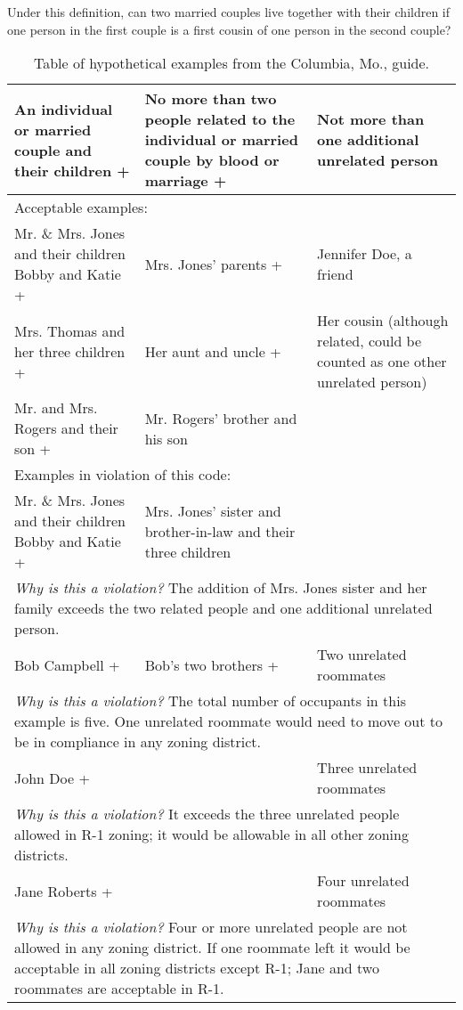 Under this definition, can two married couples live together with their children
if one person in the first couple is a first cousin of one person in the second
couple?

\begin{table}
\begin{center}
\casefont
\footnotesize
\begin{tabular}{p{}p{}p{}}
\textbf{An individual or married couple and their children +} &
\textbf{No more than two people related to the individual or married couple by
blood or marriage +} &
\textbf{Not more than one additional unrelated person} \\
\hline
\multicolumn{3}{l}{Acceptable examples:} \\
\hline
Mr. \& Mrs. Jones and their children Bobby and Katie + & Mrs. Jones' parents
+ & Jennifer Doe, a friend \\
Mrs. Thomas and her three children + & Her aunt and uncle + & Her cousin
(although related, could be counted as one other unrelated person) \\
Mr. and Mrs. Rogers and their son + & Mr. Rogers' brother and his son & \\
\hline
\multicolumn{3}{l}{Examples in violation of this code:} \\
\hline
Mr. \& Mrs. Jones and their children Bobby and Katie + & Mrs. Jones'
sister and brother-in-law and their three children & \\
\multicolumn{3}{p{0.9\textwidth}}{\emph{Why is this a violation?}
The addition of Mrs. Jones sister and her family exceeds the two related people
and one additional unrelated person.} \\
\hline
Bob Campbell + & Bob's two brothers + & Two unrelated roommates \\
\multicolumn{3}{p{0.9\textwidth}}{\emph{Why is this a violation?}
The total number of occupants in this example is five. One unrelated roommate
would need to move out to be in compliance in any zoning district.} \\
\hline
John Doe + & & Three unrelated roommates \\
\multicolumn{3}{p{0.9\textwidth}}{\emph{Why is this a violation?}
It exceeds the three unrelated people allowed in R-1 zoning; it would be
allowable in all other zoning districts.} \\
\hline
Jane Roberts + & & Four unrelated roommates \\
\multicolumn{3}{p{0.9\textwidth}}{\emph{Why is this a violation?}
Four or more unrelated people are not allowed in any zoning district. If one
roommate left it would be acceptable in all zoning districts except R-1; Jane
and two roommates are acceptable in R-1.} \\
\end{tabular}
\end{center}
\caption{Table of hypothetical examples from the Columbia, Mo., guide.}
\label{t:family-def}
\end{table}

